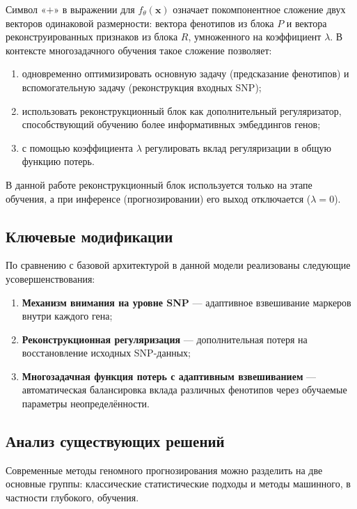 Символ «\(+\)» в выражении для \(f_\theta(\mathbf{x})\) означает
покомпонентное сложение двух векторов одинаковой размерности: вектора
фенотипов из блока \(P\) и вектора реконструированных признаков из
блока \(R\), умноженного на коэффициент \(\lambda\). В контексте
многозадачного обучения такое сложение позволяет:
\begin{enumerate}
	\item одновременно оптимизировать основную задачу (предсказание
	фенотипов) и вспомогательную задачу (реконструкция входных SNP);
	\item использовать реконструкционный блок как дополнительный
	регуляризатор, способствующий обучению более информативных
	эмбеддингов генов;
	\item с помощью коэффициента \(\lambda\) регулировать вклад
	регуляризации в общую функцию потерь.
\end{enumerate}

В данной работе реконструкционный блок используется только на этапе
обучения, а при инференсе (прогнозировании) его выход отключается
(\(\lambda = 0\)).

\subsection{Ключевые модификации}
По сравнению с базовой архитектурой в данной модели реализованы 
следующие усовершенствования:
\begin{enumerate}
	\item \textbf{Механизм внимания на уровне SNP} — адаптивное 
	взвешивание маркеров внутри каждого гена;
	\item \textbf{Реконструкционная регуляризация} — дополнительная 
	потеря на восстановление исходных SNP-данных;
	\item \textbf{Многозадачная функция потерь с адаптивным 
		взвешиванием} — автоматическая балансировка вклада различных 
	фенотипов через обучаемые параметры неопределённости.
\end{enumerate}

\subsection{Анализ существующих решений}

Современные методы геномного прогнозирования можно разделить на две основные группы: классические статистические подходы и методы машинного, в частности глубокого, обучения.

